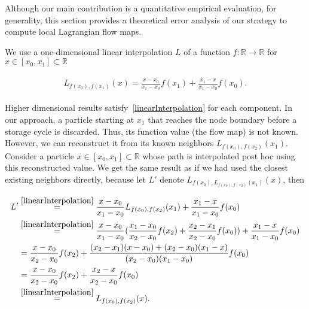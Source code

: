 \setlength{\abovedisplayskip}{0pt}
\setlength{\belowdisplayskip}{0pt}
%
Although our main contribution is a quantitative empirical evaluation, for generality, this section provides a theoretical error analysis of our strategy to compute local Lagrangian flow maps.
%

We use a one-dimensional linear interpolation $L$ of a function $f:\mathbb R\to \mathbb R$ for $x\in[x_0,x_1]\subset\mathbb R$
%
\begin{footnotesize}
\begin{eqnarray}
\begin{aligned}\label{linearInterpolation}
L_{f(x_0),f(x_1)}(x) = \frac{x-x_0}{x_1-x_0}f(x_1) + \frac{x_1-x}{x_1-x_0}f(x_0).
\end{aligned}
\end{eqnarray}
\end{footnotesize}
%
Higher dimensional results satisfy~\eqref{linearInterpolation} for each component.
In our approach, a particle starting at $x_1$ that reaches the node boundary before a storage cycle is discarded.
%
Thus, its function value (the flow map) is not known. 
%
However, we can reconstruct it from its known neighbors $L_{f(x_0),f(x_2)}(x_1)$. 
%
Consider a particle $x\in[x_0,x_1]\subset\mathbb R$ whose path is interpolated post hoc using this reconstructed value. 
%
We get the same result as if we had used the closest existing neighbors directly, because let $L'$ denote $L_{f(x_0),L_{f(x_0),f(x_2)}(x_1)}(x)$, then
%
\begin{footnotesize}
\begin{eqnarray}
\begin{aligned}\label{doubleInterpolation}
L' &\overset{\eqref{linearInterpolation}}= \frac{x-x_0}{x_1-x_0}L_{f(x_0),f(x_2)}(x_1) + \frac{x_1-x}{x_1-x_0}f(x_0)\\
&\overset{\eqref{linearInterpolation}}= \frac{x-x_0}{x_1-x_0}(\frac{x_1-x_0}{x_2-x_0}f(x_2) + \frac{x_2-x_1}{x_2-x_0}f(x_0)) + \frac{x_1-x}{x_1-x_0}f(x_0)\\
&= \frac{x-x_0}{x_2-x_0}f(x_2) + \frac{(x_2-x_1)(x-x_0)+(x_2-x_0)(x_1-x)}{(x_2-x_0)(x_1-x_0)} f(x_0)\\
&= \frac{x-x_0}{x_2-x_0}f(x_2) + \frac{x_2-x}{x_2-x_0}f(x_0)\\
&\overset{\eqref{linearInterpolation}}= L_{f(x_0),f(x_2)}(x).
\end{aligned}
\end{eqnarray}
\end{footnotesize}
